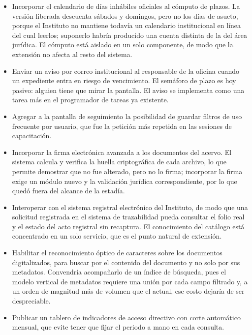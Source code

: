 \begin{description}[leftmargin=0pt,font=\bfseries,itemsep=0.55em,parsep=0pt]
  \item[Corto plazo (uno a tres meses).]\leavevmode
  \begin{itemize}[nosep,leftmargin=1.4em,topsep=1pt]
    \item Incorporar el calendario de días inhábiles oficiales al cómputo de plazos. La versión liberada descuenta sábados y domingos, pero no los días de asueto, porque el Instituto no mantiene todavía un calendario institucional en línea del cual leerlos; suponerlo habría producido una cuenta distinta de la del área jurídica. El cómputo está aislado en un solo componente, de modo que la extensión no afecta al resto del sistema.
    \item Enviar un aviso por correo institucional al responsable de la oficina cuando un expediente entra en riesgo de vencimiento. El semáforo de plazo es hoy pasivo: alguien tiene que mirar la pantalla. El aviso se implementa como una tarea más en el programador de tareas ya existente.
    \item Agregar a la pantalla de seguimiento la posibilidad de guardar filtros de uso frecuente por usuario, que fue la petición más repetida en las sesiones de capacitación.
  \end{itemize}

  \item[Mediano plazo (tres a doce meses).]\leavevmode
  \begin{itemize}[nosep,leftmargin=1.4em,topsep=1pt]
    \item Incorporar la firma electrónica avanzada a los documentos del acervo. El sistema calcula y verifica la huella criptográfica de cada archivo, lo que permite demostrar que no fue alterado, pero no lo firma; incorporar la firma exige un módulo nuevo y la validación jurídica correspondiente, por lo que quedó fuera del alcance de la estadía.
    \item Interoperar con el sistema registral electrónico del Instituto, de modo que una solicitud registrada en el sistema de trazabilidad pueda consultar el folio real y el estado del acto registral sin recaptura. El conocimiento del catálogo está concentrado en un solo servicio, que es el punto natural de extensión.
    \item Habilitar el reconocimiento óptico de caracteres sobre los documentos digitalizados, para buscar por el contenido del documento y no solo por sus metadatos. Convendría acompañarlo de un índice de búsqueda, pues el modelo vertical de metadatos requiere una unión por cada campo filtrado y, a un orden de magnitud más de volumen que el actual, ese costo dejaría de ser despreciable.
    \item Publicar un tablero de indicadores de acceso directivo con corte automático mensual, que evite tener que fijar el periodo a mano en cada consulta.
  \end{itemize}


\end{description}
